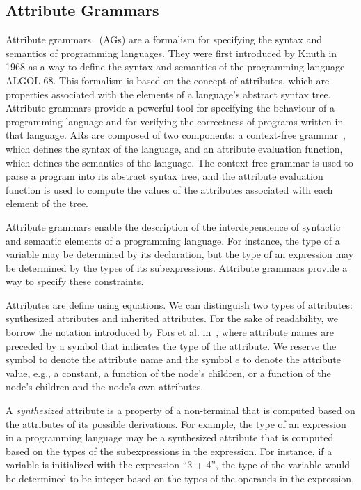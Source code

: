 \subsection{Attribute Grammars}
\label{chap:attr-grammars}
Attribute grammars~\cite{knuth1968semantics} (AGs) are a formalism for specifying
the syntax and semantics of programming languages.
They were first introduced by Knuth in 1968 as a way to define the syntax and semantics of the programming
language ALGOL 68. This formalism is based on the concept of attributes,
which are properties associated with the elements of a language's abstract syntax tree.
Attribute grammars provide a powerful tool for specifying the behaviour of a programming
language and for verifying the correctness of programs written in that language.
%
ARs are composed of two components: a context-free grammar~\cite{CREMERS197586},
which defines the syntax of the language, and an attribute evaluation function,
which defines the semantics of the language. The context-free grammar is used to
parse a program into its abstract syntax tree, and the attribute evaluation function
is used to compute the values of the attributes associated with each element
of the tree.

Attribute grammars enable the description of the 
interdependence of syntactic and semantic elements of a programming language.
For instance, the type of a variable may be determined by its declaration,
but the type of an expression may be determined by the types of its subexpressions.
Attribute grammars provide a way to specify these constraints.

Attributes are define using equations. We can distinguish two types of
attributes: synthesized attributes and inherited attributes.
For the sake of readability, we borrow the notation introduced by Fors et al. in~\cite{fors2020patterns},
where attribute names are preceded by a symbol that indicates the type of the attribute.
We reserve the symbol  to denote the attribute name and the symbol $e$ to denote the attribute value,
e.g., a constant, a function of the node's children, or a function of the node's children
and the node's own attributes.

A \emph{synthesized} attribute is a property of a non-terminal that is computed
based on the attributes of its possible derivations. For example, the type of an expression
in a programming language may be a synthesized attribute that is computed based
on the types of the subexpressions in the expression. For instance, if a variable is initialized
with the expression ``3 + 4'', the type of the variable would be determined to
be integer based on the types of the operands in the expression.

